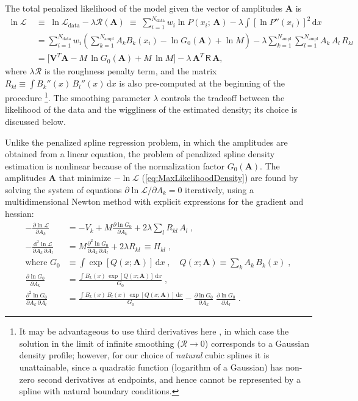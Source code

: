 \documentclass[12pt]{article}
\renewcommand{\d}{\mathrm{d}}
\newcommand{\D}{\partial}
\newcommand{\bA}{\boldsymbol{A}}
\begin{document}
The total penalized likelihood of the model given the vector of amplitudes $\bA$ is
\begin{align}
\ln\mathcal{L}\; &\equiv\; \ln\mathcal{L}_\mathrm{data} - \lambda \mathcal{R}(\bA) \;\equiv\;
\sum_{i=1}^{N_\mathrm{data}}  w_i  \ln P(x_i;\,\bA) - \lambda \int \left[\ln P''(x_i)\right]^2 \,\d x \nonumber \\
&= \sum_{i=1}^{N_\mathrm{data}} w_i \left(\sum_{k=1}^{N_\mathrm{ampl}} A_k B_k(x_i) - \ln G_0(\bA) + \ln M \right) - \lambda \sum_{k=1}^{N_\mathrm{ampl}} \sum_{l=1}^{N_\mathrm{ampl}} A_k\,A_l\,R_{kl}  \nonumber\\
&= \big[ \boldsymbol{V}^T\bA - M\, \ln G_0(\bA)  + M\, \ln M \big] - \lambda\,\bA^T\,\mathsf{R}\,\bA ,
\label{eq:MaxLikelihoodDensity}
\end{align}
where $\lambda \mathcal{R}$ is the roughness penalty term, and the matrix $R_{kl}\equiv \int B_k''(x)\,B_l''(x)\,\d x$ is also pre-computed at the beginning of the procedure%
\footnote{It may be advantageous to use third derivatives here \cite{Silverman1982}, in which case the solution in the limit of infinite smoothing ($\mathcal{R}\to 0$) corresponds to a Gaussian density profile; however, for our choice of \textit{natural} cubic splines it is unattainable, since a quadratic function (logarithm of a Gaussian) has non-zero second derivatives at endpoints, and hence cannot be represented by a spline with natural boundary conditions.}.
The smoothing parameter $\lambda$ controls the tradeoff between the likelihood of the data and the wiggliness of the estimated density; its choice is discussed below.

Unlike the penalized spline regression problem, in which the amplitudes are obtained from a linear equation, the problem of penalized spline density estimation is nonlinear because of the normalization factor $G_0(\bA)$. The amplitudes $\bA$ that minimize $-\!\ln\mathcal{L}$ (\ref{eq:MaxLikelihoodDensity}) are found by solving the system of equations $\D \ln\mathcal{L}/\D A_k=0$ iteratively, using a multidimensional Newton method with explicit expressions for the gradient and hessian:
\begin{subequations}
\begin{align}
-\frac{\D \ln\mathcal{L}}{\D A_k} &= -V_k + M \frac{\D \ln G_0}{\D A_k} + 2\lambda \sum_l R_{kl}\,A_l \;, \label{eq:lnLgrad} \\
-\frac{\d^2 \ln\mathcal{L}}{\D A_k\, \D A_l} &= M \frac{\D ^2 \ln G_0}{\D A_k\, \D A_l} + 2\lambda R_{kl} \,\equiv H_{kl}\;, \\
\mbox{where }G_0 &\equiv \int \exp[Q(x; \bA)]\,\d x \;, \quad
Q(x; \bA) \equiv \sum_k  A_k\, B_k(x) \;, \nonumber \\
\frac{\D \ln G_0}{\D A_k} &= \frac{\int B_k(x)\,\exp[Q(x; \bA)]\,\d x}{G_0} \;, \nonumber\\
\frac{\D ^2 \ln G_0}{\D A_k\, \D A_l} &= \frac{\int B_k(x)\,B_l(x)\,\exp[Q(x; \bA)]\,\d x}{G_0} - \frac{\D \ln G_0}{\D A_k}\; \frac{\D \ln G_0}{\D A_l} \;. \nonumber
\end{align}
\end{subequations}
\end{document}
